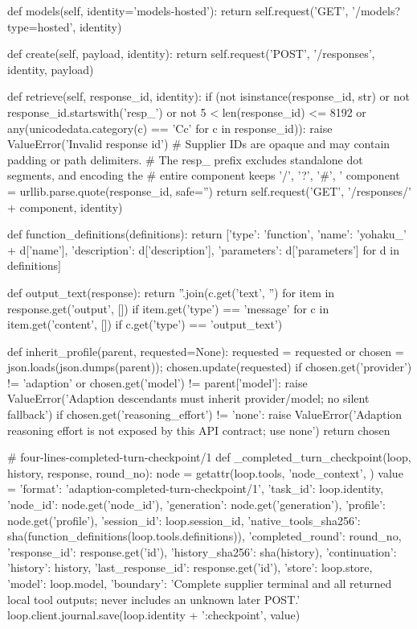 {    def models(self, identity='models-hosted'):
        return self.request('GET', '/models?type=hosted', identity)

    def create(self, payload, identity):
        return self.request('POST', '/responses', identity, payload)

    def retrieve(self, response_id, identity):
        if (not isinstance(response_id, str) or not response_id.startswith('resp_') or
                not 5 < len(response_id) <= 8192 or
                any(unicodedata.category(c) == 'Cc' for c in response_id)):
            raise ValueError('Invalid response id')
        # Supplier IDs are opaque and may contain padding or path delimiters.
        # The resp_ prefix excludes standalone dot segments, and encoding the
        # entire component keeps '/', '?', '#', '%
        component = urllib.parse.quote(response_id, safe='')
        return self.request('GET', '/responses/' + component, identity)


def function_definitions(definitions):
    return [{'type': 'function', 'name': 'yohaku_' + d['name'],
             'description': d['description'], 'parameters': d['parameters']} for d in definitions]


def output_text(response):
    return ''.join(c.get('text', '') for item in response.get('output', []) if item.get('type') == 'message'
                   for c in item.get('content', []) if c.get('type') == 'output_text')


def inherit_profile(parent, requested=None):
    requested = requested or {}
    chosen = json.loads(json.dumps(parent)); chosen.update(requested)
    if chosen.get('provider') != 'adaption' or chosen.get('model') != parent['model']:
        raise ValueError('Adaption descendants must inherit provider/model; no silent fallback')
    if chosen.get('reasoning_effort') != 'none':
        raise ValueError('Adaption reasoning effort is not exposed by this API contract; use none')
    return chosen


# four-lines-completed-turn-checkpoint/1
def _completed_turn_checkpoint(loop, history, response, round_no):
    node = getattr(loop.tools, 'node_context', {})
    value = {'format': 'adaption-completed-turn-checkpoint/1',
        'task_id': loop.identity, 'node_id': node.get('node_id'),
        'generation': node.get('generation'), 'profile': node.get('profile'),
        'session_id': loop.session_id, 'native_tools_sha256': sha(function_definitions(loop.tools.definitions)),
        'completed_round': round_no, 'response_id': response.get('id'),
        'history_sha256': sha(history),
        'continuation': {'history': history, 'last_response_id': response.get('id'), 'store': loop.store, 'model': loop.model},
        'boundary': 'Complete supplier terminal and all returned local tool outputs; never includes an unknown later POST.'}
    loop.client.journal.save(loop.identity + ':checkpoint', value)

}
